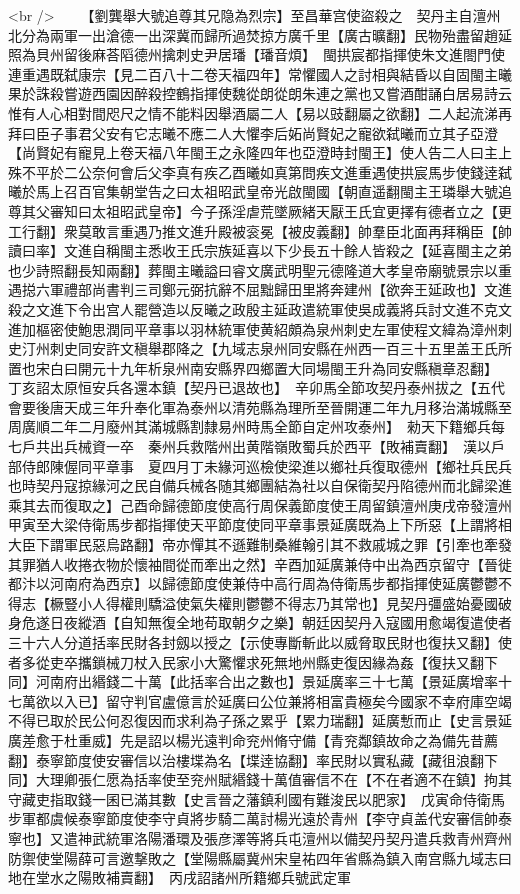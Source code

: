 <br />
　　【劉龔舉大號追尊其兄隐為烈宗】至昌華宫使盜殺之　契丹主自澶州北分為兩軍一出滄德一出深冀而歸所過焚掠方廣千里【廣古曠翻】民物殆盡留趙延照為貝州留後麻荅䧟德州擒刺史尹居璠【璠音煩】　閩拱宸都指揮使朱文進閤門使連重遇既弑康宗【見二百八十二卷天福四年】常懼國人之討相與結昏以自固閩主曦果於誅殺嘗遊西園因醉殺控鶴指揮使魏從朗從朗朱連之黨也又嘗酒酣誦白居易詩云惟有人心相對間咫尺之情不能料因舉酒屬二人【易以豉翻屬之欲翻】二人起流涕再拜曰臣子事君父安有它志曦不應二人大懼李后妬尚賢妃之寵欲弑曦而立其子亞澄【尚賢妃有寵見上卷天福八年閩王之永隆四年也亞澄時封閩王】使人告二人曰主上殊不平於二公奈何會后父李真有疾乙酉曦如真第問疾文進重遇使拱宸馬步使錢逹弑曦於馬上召百官集朝堂告之曰太祖昭武皇帝光啟閩國【朝直遥翻閩主王璘舉大號追尊其父審知曰太祖昭武皇帝】今子孫淫虐荒墜厥緒天厭王氏宜更擇有德者立之【更工行翻】衆莫敢言重遇乃推文進升殿被衮冕【被皮義翻】帥羣臣北面再拜稱臣【帥讀曰率】文進自稱閩主悉收王氏宗族延喜以下少長五十餘人皆殺之【延喜閩主之弟也少詩照翻長知兩翻】葬閩主曦謚曰睿文廣武明聖元德隆道大孝皇帝廟號景宗以重遇搃六軍禮部尚書判三司鄭元弼抗辭不屈黜歸田里將奔建州【欲奔王延政也】文進殺之文進下令出宫人罷營造以反曦之政殷主延政遣統軍使吳成義將兵討文進不克文進加樞密使鮑思潤同平章事以羽林統軍使黄紹頗為泉州刺史左軍使程文緯為漳州刺史汀州刺史同安許文稹舉郡降之【九域志泉州同安縣在州西一百三十五里盖王氏所置也宋白曰開元十九年析泉州南安縣界四鄉置大同場閩王升為同安縣稹章忍翻】　丁亥詔太原恒安兵各還本鎮【契丹已退故也】　辛卯馬全節攻契丹泰州拔之【五代會要後唐天成三年升奉化軍為泰州以清苑縣為理所至晉開運二年九月移治滿城縣至周廣順二年二月廢州其滿城縣割隸易州時馬全節自定州攻泰州】　勑天下籍鄉兵每七戶共出兵械資一卒　秦州兵救階州出黄階嶺敗蜀兵於西平【敗補賣翻】　漢以戶部侍郎陳偓同平章事　夏四月丁未緣河巡檢使梁進以鄉社兵復取德州【鄉社兵民兵也時契丹寇掠緣河之民自備兵械各随其鄉團結為社以自保衛契丹陷德州而北歸梁進乘其去而復取之】己酉命歸德節度使高行周保義節度使王周留鎮澶州庚戌帝發澶州甲寅至大梁侍衛馬步都指揮使天平節度使同平章事景延廣既為上下所惡【上謂將相大臣下謂軍民惡烏路翻】帝亦憚其不遜難制桑維翰引其不救戚城之罪【引牽也牽發其罪猶人收捲衣物於懷袖間從而牽出之然】辛酉加延廣兼侍中出為西京留守【晉徙都汴以河南府為西京】以歸德節度使兼侍中高行周為侍衛馬步都指揮使延廣鬱鬱不得志【橛豎小人得權則驕溢使氣失權則鬱鬱不得志乃其常也】見契丹彊盛始憂國破身危遂日夜縱酒【自知無復全地苟取朝夕之樂】朝廷因契丹入寇國用愈竭復遣使者三十六人分道括率民財各封劔以授之【示使專斷斬此以威脅取民財也復扶又翻】使者多從吏卒攜鎖械刀杖入民家小大驚懼求死無地州縣吏復因緣為姦【復扶又翻下同】河南府出緡錢二十萬【此括率合出之數也】景延廣率三十七萬【景延廣增率十七萬欲以入已】留守判官盧億言於延廣曰公位兼將相富貴極矣今國家不幸府庫空竭不得已取於民公何忍復因而求利為子孫之累乎【累力瑞翻】延廣慙而止【史言景延廣差愈于杜重威】先是詔以楊光遠判命兖州脩守備【青兖鄰鎮故命之為備先昔薦翻】泰寧節度使安審信以治樓堞為名【堞逹協翻】率民財以實私藏【藏徂浪翻下同】大理卿張仁愿為括率使至兖州賦緡錢十萬值審信不在【不在者適不在鎮】拘其守藏吏指取錢一囷已滿其數【史言晉之藩鎮利國有難浚民以肥家】　戊寅命侍衛馬步軍都虞候泰寧節度使李守貞將步騎二萬討楊光遠於青州【李守貞盖代安審信帥泰寧也】又遣神武統軍洛陽潘環及張彦澤等將兵屯澶州以備契丹契丹遣兵救青州齊州防禦使堂陽薛可言邀撃敗之【堂陽縣屬冀州宋皇祐四年省縣為鎮入南宫縣九域志曰地在堂水之陽敗補賣翻】　丙戌詔諸州所籍鄉兵號武定軍
